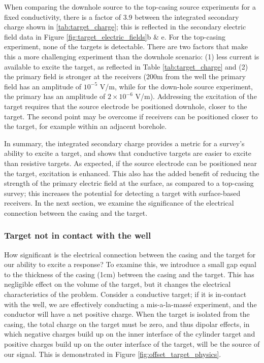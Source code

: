 When comparing the downhole source to the top-casing source experiments for a fixed conductivity, there is a factor of 3.9 between the integrated secondary charge shown in \ref{tab:target_charge}; this is reflected in the secondary electric field data in Figure \ref{fig:target_electric_fields}b \& e.  For the top-casing experiment, none of the targets is detectable. There are two factors that make this a more challenging experiment than the downhole scenario: (1) less current is available to excite the target, as reflected in Table \ref{tab:target_charge} and (2) the primary field is stronger at the receivers (200m from the well the primary field has an amplitude of $10^{-5}$ V/m, while for the down-hole source experiment, the primary has an amplitude of $2 \times 10^{-6}$ V/m). Addressing the excitation of the target requires that the source electrode be positioned downhole, closer to the target. The second point may be overcome if receivers can be positioned closer to the target, for example within an adjacent borehole.

In summary, the integrated secondary charge provides a metric for a survey's ability to excite a target, and shows that conductive targets are easier to excite than resistive targets. As expected, if the source electrode can be positioned near the target, excitation is enhanced. This also has the added benefit of reducing the strength of the primary electric field at the surface, as compared to a top-casing survey; this  increases the potential for detecting a target with surface-based receivers. In the next section, we examine the significance of the electrical connection between the casing and the target.

\subsubsection{Target not in contact with the well}

How significant is the electrical connection between the casing and the target for our ability to excite a response? To examine this, we introduce a small gap equal to the thickness of the casing (1cm) between the casing and the target. This has negligible effect on the volume of the target, but it changes the electrical characteristics of the problem. Consider a conductive target; if it is in-contact with the well, we are effectively conducting a mis-a-la-mass\'e experiment, and the conductor will have a net positive charge. When the target is isolated from the casing, the total charge on the target must be zero, and thus dipolar effects, in which negative charges build up on the inner interface of the cylinder target and positive charges build up on the outer interface of the target, will be the source of our signal. This is demonstrated in Figure \ref{fig:offset_target_physics}.

